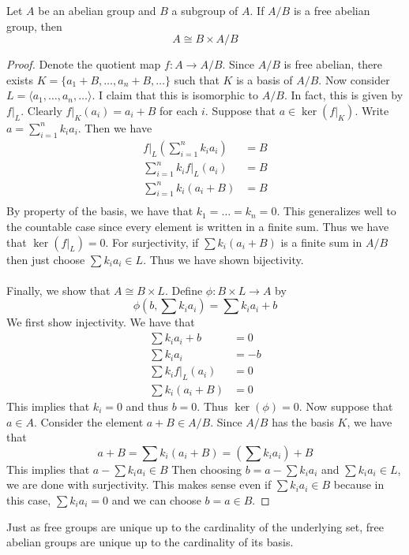 \documentclass[a4paper]{article}
\begin{document}
\begin{prp}{}{} Let $A$ be an abelian group and $B$ a subgroup of $A$. If $A/B$ is a free abelian group, then $$A\cong B\times A/B$$ \tcbline
\begin{proof}
Denote the quotient map $f:A\to A/B$. Since $A/B$ is free abelian, there exists $K=\{a_1+B,\dots,a_n+B,\dots\}$ such that $K$ is a basis of $A/B$. Now consider $L=\langle a_1,\dots,a_n,\dots\rangle$. I claim that this is isomorphic to $A/B$. In fact, this is given by $f|_L$. Clearly $f|_K(a_i)=a_i+B$ for each $i$. Suppose that $a\in\ker(f|_K)$. Write $a=\sum_{i=1}^nk_ia_i$. Then we have 
\begin{align*}
f|_L\left(\sum_{i=1}^nk_ia_i\right)&=B\\
\sum_{i=1}^nk_if|_L(a_i)&=B\\
\sum_{i=1}^nk_i(a_i+B)&=B\\
\end{align*}
By property of the basis, we have that $k_1=\dots=k_n=0$. This generalizes well to the countable case since every element is written in a finite sum. Thus we have that $\ker(f|_L)=0$. For surjectivity, if $\sum k_i(a_i+B)$ is a finite sum in $A/B$ then just choose $\sum k_ia_i\in L$. Thus we have shown bijectivity. \\~\\
Finally, we show that $A\cong B\times L$. Define $\phi:B\times L\to A$ by $$\phi\left(b,\sum k_ia_i\right)=\sum k_ia_i+b$$ We first show injectivity. We have that 
\begin{align*}
\sum k_ia_i+b&=0\\
\sum k_ia_i&=-b\\
\sum k_if|_L(a_i)&=0\\
\sum k_i(a_i+B)&=0
\end{align*}
This implies that $k_i=0$ and thus $b=0$. Thus $\ker(\phi)=0$. Now suppose that $a\in A$. Consider the element $a+B\in A/B$. Since $A/B$ has the basis $K$, we have that $$a+B=\sum k_i(a_i+B)=\left(\sum k_ia_i\right)+B$$ This implies that $a-\sum k_ia_i\in B$ Then choosing $b=a-\sum k_ia_i$ and $\sum k_ia_i\in L$, we are done with surjectivity. This makes sense even if $\sum k_ia_i\in B$ because in this case, $\sum k_ia_i=0$ and we can choose $b=a\in B$. 
\end{proof}
\end{prp}

Just as free groups are unique up to the cardinality of the underlying set, free abelian groups are unique up to the cardinality of its basis. 
\end{document}
